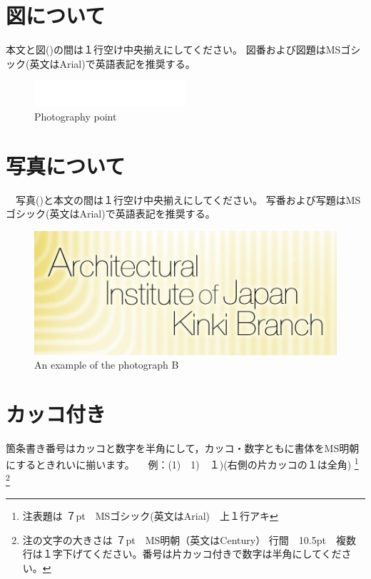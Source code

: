 \documentclass[base=10pt,magstyle=real,a4paper,twocolumn,xelatex,pandoc,jafont=ms]{bxjsarticle}
\begin{document}
\section{図について}
本文と図()の間は１行空け中央揃えにしてください。
図番および図題はMSゴシック(英文はArial)で英語表記を推奨する。
\begin{figure}[h]
	\centering
	\includegraphics[width=1\linewidth]{../figure/figure1}
	\caption{Photography point}
	\label{fig:figure1}
\end{figure}


\section{写真について}
　写真()と本文の間は１行空け中央揃えにしてください。
写番および写題はMSゴシック(英文はArial)で英語表記を推奨する。

\begin{figure}[h]
	\centering
	\includegraphics[width=1\linewidth]{../figure/photo1}
	\caption{An example of the photograph B}
	\label{fig:photo1}
\end{figure}


\section{カッコ付き}
箇条書き番号はカッコと数字を半角にして，カッコ・数字ともに書体をMS明朝にするときれいに揃います。
　例：(1)　1)　１)(右側の片カッコの１は全角)
\footnote{注表題は ７pt　MSゴシック(英文はArial)　上１行アキ}
\footnote{注の文字の大きさは ７pt　MS明朝（英文はCentury） 行間　10.5pt　複数行は１字下げてください。番号は片カッコ付きで数字は半角にしてください。}
\end{document}
